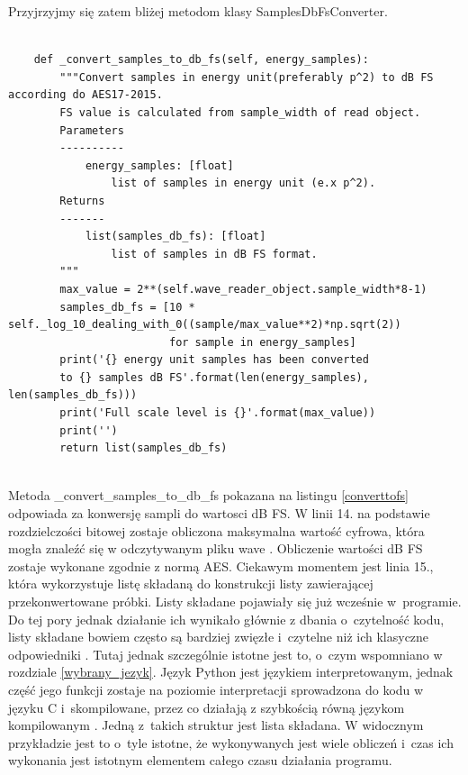 \documentclass[eng,printmode]{mgr}
\begin{document}
Przyjrzyjmy się zatem bliżej metodom klasy SamplesDbFsConverter.

\begin{minipage}{\linewidth}
\begin{lstlisting}[caption={Fragment kodu źródłowego pliku SampledBConverter.py,\newline klasa SamplesDbFSConverter, metoda \_convert\_samples\_to\_db\_fs},captionpos=b,label={converttofs}]

    def _convert_samples_to_db_fs(self, energy_samples):
        """Convert samples in energy unit(preferably p^2) to dB FS according do AES17-2015.
        FS value is calculated from sample_width of read object.
        Parameters
        ----------
            energy_samples: [float]
                list of samples in energy unit (e.x p^2).
        Returns
        -------
            list(samples_db_fs): [float]
                list of samples in dB FS format.
        """
        max_value = 2**(self.wave_reader_object.sample_width*8-1)
        samples_db_fs = [10 * self._log_10_dealing_with_0((sample/max_value**2)*np.sqrt(2))
                         for sample in energy_samples]
        print('{} energy unit samples has been converted
        to {} samples dB FS'.format(len(energy_samples), len(samples_db_fs)))
        print('Full scale level is {}'.format(max_value))
        print('')
        return list(samples_db_fs)
    
\end{lstlisting}
\end{minipage}

Metoda \_convert\_samples\_to\_db\_fs pokazana na listingu \ref{converttofs} odpowiada za konwersję sampli do wartosci dB FS. W linii 14. na podstawie rozdzielczości bitowej zostaje obliczona maksymalna wartość cyfrowa, która mogła znaleźć się w odczytywanym pliku wave \cite{Cyfrowe_przetwarzanie_sygnalow}. Obliczenie wartości dB FS zostaje wykonane zgodnie z normą AES\linebreak \cite{AES17}. Ciekawym momentem jest linia 15., która wykorzystuje listę składaną do konstrukcji listy zawierającej przekonwertowane próbki. Listy składane pojawiały się już wcześnie w~programie. Do tej pory jednak działanie ich wynikało głównie z dbania o~czytelność kodu, listy składane bowiem często są bardziej zwięzłe i~czytelne niż ich klasyczne odpowiedniki \cite{Python_data_structures}. Tutaj jednak szczególnie istotne jest to, o~czym wspomniano w rozdziale \ref{wybrany_jezyk}. Język Python jest językiem interpretowanym, jednak część jego funkcji zostaje na poziomie interpretacji sprowadzona do kodu w języku C i~skompilowane, przez co działają z szybkością równą językom kompilowanym \cite{Wprowadzenie_python}. Jedną z~takich struktur jest lista składana. W widocznym przykładzie jest to o~tyle istotne, że wykonywanych jest wiele obliczeń i~czas ich wykonania jest istotnym elementem całego czasu działania programu.
\end{document}
